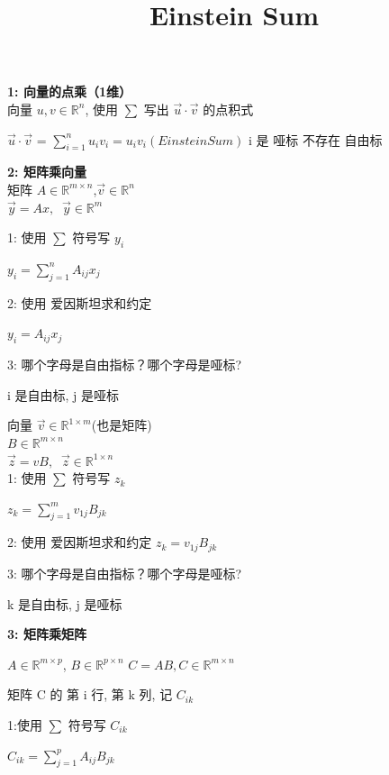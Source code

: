 \documentclass[12pt]{article}
\title{Einstein Sum}
\date{}
\begin{document}
\maketitle

\vspace{0.5em}
\noindent\textbf{1: 向量的点乘（1维）}\\
向量 $u,v \in \mathbb{R}^{n}$,
使用 $\sum$ 写出 $\vec{u} \cdot \vec{v}$ 的点积式

$\vec{u} \cdot \vec{v}$  = $\sum_{i = 1}^{n}u_{i}v_{i} = u_{i}v_{i}(Einstein Sum)$
i 是 哑标 不存在 自由标


\vspace{0.5em}
\noindent\textbf{2: 矩阵乘向量}\\
矩阵 $A \in \mathbb{R}^{m \times n}$,$\vec{v} \in \mathbb{R}^{n}$ \\
$\vec{y} = Ax, \;\; \vec{y} \in \mathbb{R}^{m}$

1: 使用 $\sum$ 符号写 $y_{i}$

$y_{i} = \sum_{j = 1}^{n}A_{ij}x_{j}$


2: 使用 爱因斯坦求和约定

$y_{i} = A_{ij}x_{j}$

3: 哪个字母是自由指标？哪个字母是哑标?

i 是自由标, j 是哑标

\vspace{0.5em}

向量 $\vec{v} \in \mathbb{R}^{1 \times m}$(也是矩阵) \\
$B \in \mathbb{R}^{m \times n}$ \\
$\vec{z} = vB, \;\; \vec{z} \in  \mathbb{R}^{1 \times n}$ \\

1: 使用 $\sum$ 符号写 $z_{k}$

$z_{k} = \sum_{j = 1}^{m}v_{1j}B_{jk}$


2: 使用 爱因斯坦求和约定
$z_{k} = v_{1j}B_{jk}$


3: 哪个字母是自由指标？哪个字母是哑标?

k 是自由标, j 是哑标


\vspace{0.5em}
\noindent\textbf{3: 矩阵乘矩阵}

$A \in \mathbb{R}^{m \times p}$, $B \in \mathbb{R}^{p \times n}$
$C = AB, C \in \mathbb{R}^{m \times n}$

矩阵 C 的 第 i 行, 第 k 列, 记 $C_{ik}$

1:使用 $\sum$ 符号写 $C_{ik}$

$C_{ik} = \sum_{j = 1}^{p} A_{ij}B_{jk}$
\end{document}
